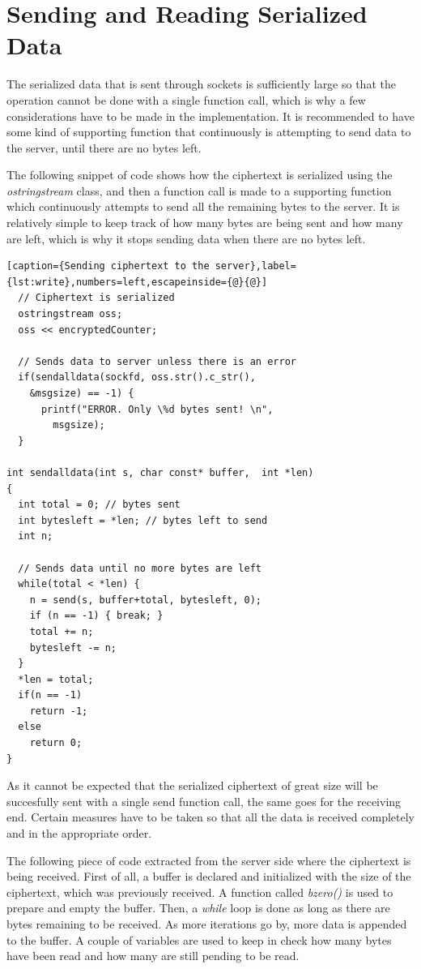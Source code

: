 \section{{Sending and Reading Serialized Data}}

The serialized data that is sent through sockets is sufficiently large so that the operation cannot be done with a single function call, which is why a few considerations have to be made in the implementation. It is recommended to have some kind of supporting function that continuously is attempting to send data to the server, until there are no bytes left.

The following snippet of code shows how the ciphertext is serialized using the \textit{ostringstream} class, and then a function call is made to a supporting function which continuously attempts to send all the remaining bytes to the server. It is relatively simple to keep track of how many bytes are being sent and how many are left, which is why it stops sending data when there are no bytes left.
\begin{lstlisting}[caption={Sending ciphertext to the server},label={lst:write},numbers=left,escapeinside={@}{@}]
  // Ciphertext is serialized
  ostringstream oss;
  oss << encryptedCounter;
  
  // Sends data to server unless there is an error
  if(sendalldata(sockfd, oss.str().c_str(), 
    &msgsize) == -1) {
      printf("ERROR. Only \%d bytes sent! \n", 
        msgsize);
  }

int sendalldata(int s, char const* buffer,  int *len)
{
  int total = 0; // bytes sent
  int bytesleft = *len; // bytes left to send
  int n;
  
  // Sends data until no more bytes are left
  while(total < *len) {
    n = send(s, buffer+total, bytesleft, 0);
    if (n == -1) { break; }
    total += n;
    bytesleft -= n;
  }
  *len = total; 
  if(n == -1) 
    return -1;
  else 
    return 0;
}
\end{lstlisting}

As it cannot be expected that the serialized ciphertext of great size will be succesfully sent with a single send function call, the same goes for the receiving end. Certain measures have to be taken so that all the data is received completely and in the appropriate order.

The following piece of code extracted from the server side where the ciphertext is being received. First of all, a buffer is declared and initialized with the size of the ciphertext, which was previously received. A function called \textit{bzero()} is used to prepare and empty the buffer. Then, a \textit{while} loop is done as long as there are bytes remaining to be received. As more iterations go by, more data is appended to the buffer. A couple of variables are used to keep in check how many bytes have been read and how many are still pending to be read.

